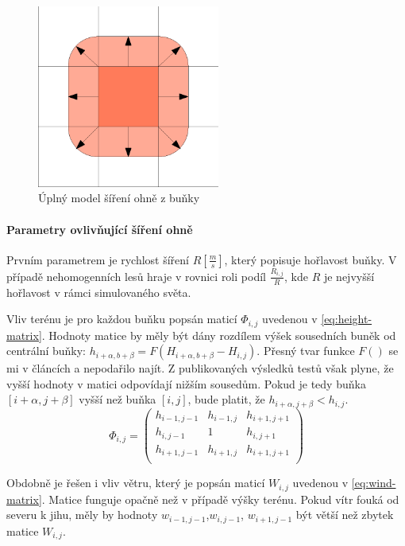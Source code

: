 \documentclass[11pt,a4paper]{scrartcl}
\begin{document}
	\begin{figure}[H]
		\centering
		\includegraphics[width=6cm]{model-full-spread}
		\caption{Úplný model šíření ohně z buňky}
		\label{fig:full-model}
	\end{figure}
	
	\paragraph{Parametry ovlivňující šíření ohně} Prvním parametrem je rychlost šíření $R [\frac{m}{s}]$, který popisuje hořlavost buňky. V případě nehomogenních lesů hraje v rovnici roli podíl $\frac{R_{i,j}}{R}$, kde $R$ je nejvyšší hořlavost v rámci simulovaného světa.
	
	Vliv terénu je pro každou buňku popsán maticí $\Phi_{i,j}$ uvedenou v \ref{eq:height-matrix}. Hodnoty matice by měly být dány rozdílem výšek sousedních buněk od centrální buňky: $h_{i+\alpha,b+\beta} = F(H_{i+\alpha,b+\beta} - H_{i,j})$. Přesný tvar funkce $F()$ se mi v článcích \cite{source_article} a \cite{old_model_art} nepodařilo najít. Z publikovaných výsledků testů však plyne, že vyšší hodnoty v matici odpovídají nižším sousedům. Pokud je tedy buňka $[i+\alpha, j+\beta]$ vyšší než buňka $[i,j]$, bude platit, že $h_{i+\alpha, j+\beta} < h_{i,j}$.
\begin{equation}
	\Phi_{i,j} =
	\begin{pmatrix}
	h_{i-1,j-1}       & h_{i-1,j} & h_{i+1,j+1} \\
	h_{i,j-1}       & 1 & h_{i,j+1} \\
	h_{i+1,j-1}       & h_{i+1,j} & h_{i+1,j+1} \\
	\end{pmatrix}
	\label{eq:height-matrix}
\end{equation}	
	
	Obdobně je řešen i vliv větru, který je popsán maticí $W_{i,j}$ uvedenou v \ref{eq:wind-matrix}. Matice funguje opačně než v případě výšky terénu. Pokud vítr fouká od severu k jihu, měly by hodnoty $w_{i-1,j-1}$,$w_{i,j-1}$, $w_{i+1,j-1}$ být větší než zbytek matice $W_{i,j}$.
	
\end{document}
